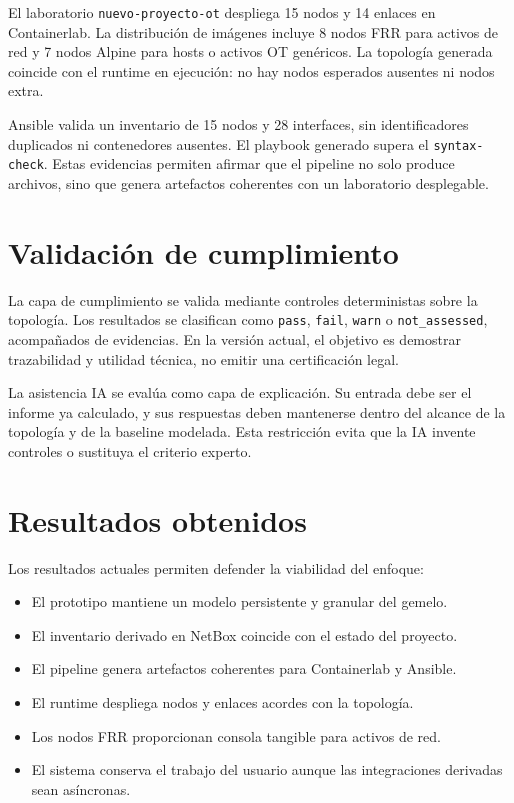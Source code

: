 El laboratorio \texttt{nuevo-proyecto-ot} despliega 15 nodos y 14 enlaces en Containerlab. La distribución de imágenes incluye 8 nodos FRR para activos de red y 7 nodos Alpine para hosts o activos OT genéricos. La topología generada coincide con el runtime en ejecución: no hay nodos esperados ausentes ni nodos extra.

Ansible valida un inventario de 15 nodos y 28 interfaces, sin identificadores duplicados ni contenedores ausentes. El playbook generado supera el \texttt{syntax-check}. Estas evidencias permiten afirmar que el pipeline no solo produce archivos, sino que genera artefactos coherentes con un laboratorio desplegable.

\section{Validación de cumplimiento} \label{sec:validacion-cumplimiento}

La capa de cumplimiento se valida mediante controles deterministas sobre la topología. Los resultados se clasifican como \texttt{pass}, \texttt{fail}, \texttt{warn} o \texttt{not\_assessed}, acompañados de evidencias. En la versión actual, el objetivo es demostrar trazabilidad y utilidad técnica, no emitir una certificación legal.

La asistencia IA se evalúa como capa de explicación. Su entrada debe ser el informe ya calculado, y sus respuestas deben mantenerse dentro del alcance de la topología y de la baseline modelada. Esta restricción evita que la IA invente controles o sustituya el criterio experto.

\section{Resultados obtenidos} \label{sec:resultados-obtenidos}

Los resultados actuales permiten defender la viabilidad del enfoque:

\begin{itemize}
    \item El prototipo mantiene un modelo persistente y granular del gemelo.
    \item El inventario derivado en NetBox coincide con el estado del proyecto.
    \item El pipeline genera artefactos coherentes para Containerlab y Ansible.
    \item El runtime despliega nodos y enlaces acordes con la topología.
    \item Los nodos FRR proporcionan consola tangible para activos de red.
    \item El sistema conserva el trabajo del usuario aunque las integraciones derivadas sean asíncronas.
\end{itemize}


